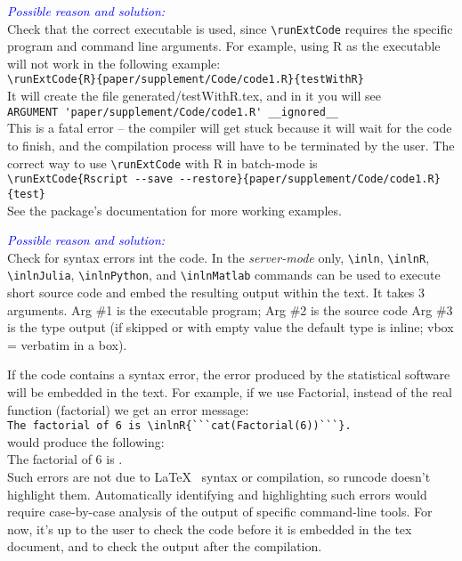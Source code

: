 \documentclass[a4paper,10pt]{article}
\newcommand{\cause}[1] {\noindent\textit{\textcolor{blue}{Possible reason and solution:}}\\#1}
\begin{document}
\cause\bgroup
Check that the correct executable is used, since \verb|\runExtCode| requires the specific program and command line arguments. For example, using R as the executable will not work in the following example:\\
\verb|\runExtCode{R}{paper/supplement/Code/code1.R}{testWithR}|\\
It will create the file generated/testWithR.tex, and in it you will see\\
\verb|ARGUMENT 'paper/supplement/Code/code1.R' __ignored__|\\
This is a fatal error -- the compiler will get stuck because it will wait for the code to finish, and the compilation process will have to be terminated by the user.
\noindent
The correct way to use \verb|\runExtCode| with R in batch-mode is\\
\verb|\runExtCode{Rscript --save --restore}{paper/supplement/Code/code1.R}{test}|\\
See the package's documentation for more working examples.\\
\egroup


\cause\bgroup
Check for syntax errors int the code.
In the \textit{server-mode} only, \verb|\inln|, \verb|\inlnR|, \verb|\inlnJulia|, \verb|\inlnPython|, and \verb|\inlnMatlab| commands can be used to execute short source code and embed the resulting output within the text. It takes 3 arguments.
Arg \#1 is the executable program;
Arg \#2 is the source code
Arg \#3 is the type output (if skipped or with empty value the default type is inline; vbox = verbatim in a box).

\noindent If the code contains a syntax error, the error produced by the statistical software will be embedded in the text. For example, if we use Factorial, instead of the real function (factorial) we get an error message:\\
\verb|The factorial of 6 is \inlnR{```cat(Factorial(6))```}.|\\
would produce the following:\\
The factorial of 6 is .\\

\noindent Such errors are not due to \LaTeX~ syntax or compilation, so runcode doesn't highlight them. Automatically identifying and highlighting such errors would require case-by-case analysis of the output of specific command-line tools. For now, it's up to the user to check the code before it is embedded in the tex document, and to check the output after the compilation.
\egroup
\end{document}
